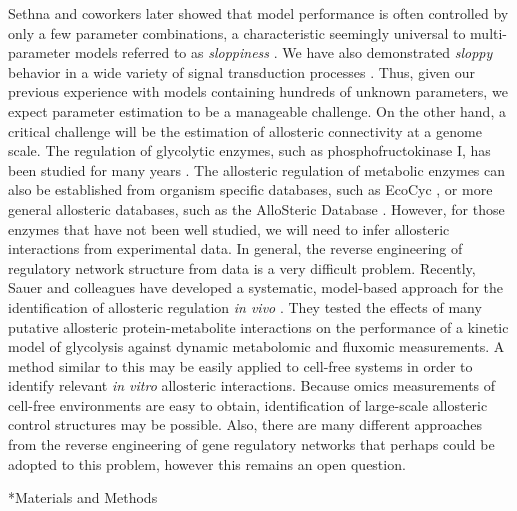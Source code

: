 \documentclass[12pt]{article}
\makeatletter
\renewcommand\section{\@startsection
	{subsection}{2}{0mm}
	{-0.2in}
	{0.05\baselineskip}
	{\normalfont\large\bfseries}}
\makeatother
\begin{document}
Sethna and coworkers later showed that model performance is often controlled by only a few parameter combinations, 
a characteristic seemingly universal to multi-parameter models referred to as \textit{sloppiness} \citep{Machta:2013aa}.
We have also demonstrated \textit{sloppy} behavior in a wide variety of signal transduction processes \citep{Luan:2007aa,Song:2009aa,Tasseff:2010aa,Tasseff:2011aa,Nayak:2011aa,Lequieu:2011aa}.
Thus, given our previous experience with models containing hundreds of unknown parameters, we expect parameter estimation to be a manageable challenge. 
On the other hand, a critical challenge will be the estimation of allosteric connectivity at a genome scale. 
The regulation of glycolytic enzymes, such as phosphofructokinase I, has been studied for many years \citep{BERG_BIOCHEMISTRY,Peskov:2008aa}. 
The allosteric regulation of metabolic enzymes can also be established from organism specific databases, such as EcoCyc \citep{Keseler:2013aa}, 
or more general allosteric databases, such as the AlloSteric Database \citep{Huang:2014aa}. 
However, for those enzymes that have not been well studied, we will need to infer allosteric interactions from experimental data.
In general, the reverse engineering of regulatory network structure from data is a very difficult problem. 
Recently, Sauer and colleagues have developed a systematic, model-based approach for the identification of allosteric regulation \textit{in vivo} \cite{Link:2013aa}. 
They tested the effects of many putative allosteric protein-metabolite interactions on the performance of a kinetic model of glycolysis against dynamic metabolomic and fluxomic measurements. 
A method similar to this may be easily applied to cell-free systems in order to identify relevant \textit{in vitro} allosteric interactions. 
Because omics measurements of cell-free environments are easy to obtain, identification of large-scale allosteric control structures may be possible. 
Also, there are many different approaches from the reverse engineering of gene regulatory networks that perhaps could be adopted to this problem, however this remains an open question.


\clearpage

\section*{Materials and Methods}
\end{document}
